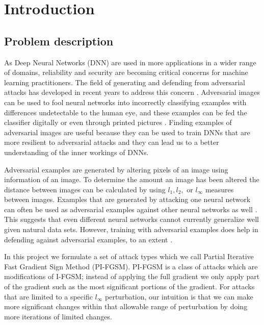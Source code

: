 \section{Introduction}
\subsection{Problem description}
As Deep Neural Networks (DNN) are used in more applications in a wider range of domains, reliability and security are becoming critical concerns for machine learning practitioners. The field of generating and defending from adversarial attacks has developed in recent years to address this concern \cite{szegedy2013intriguing, goodfellow6572explaining}. Adversarial images can be used to fool neural networks into incorrectly classifying examples with differences undetectable to the human eye, and these examples can be fed the classifier digitally or even through printed pictures \cite{kurakin2016adversarial}. Finding examples of adversarial images are useful because they can be used to train DNNs that are more resilient to adversarial attacks \cite{goodfellow6572explaining, madry2017towards} and they can lead us to a better understanding of the inner workings of DNNs.

Adversarial examples are generated by altering pixels of an image using information of an image. To determine the amount an image has been altered the distance between images can be calculated by using $l_1, l_2,$ or $l_\infty$ measures between images. Examples that are generated by attacking one neural network can often be used as adversarial examples against other neural networks as well \cite{szegedy2013intriguing}. This suggests that even different neural networks cannot currently generalize well given natural data sets. However, training with adversarial examples does help in defending against adversarial examples, to an extent \cite{goodfellow6572explaining}.

In this project we formulate a set of attack types which we call Partial Iterative Fast Gradient Sign Method (PI-FGSM). PI-FGSM is a class of attacks which are modifications of I-FGSM; instead of applying the full gradient we only apply part of the gradient such as the most significant portions of the gradient. For attacks that are limited to a specific $l_\infty$ perturbation, our intuition is that we can make more significant changes within that allowable range of perturbation by doing more iterations of limited changes.
